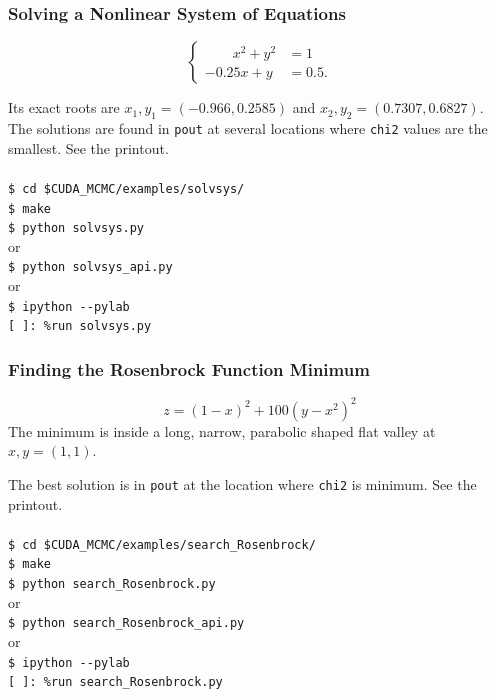 \documentclass[preprint2]{aastex}
\begin{document}
\subsubsection{Solving a Nonlinear System of Equations}

\begin{equation}
  \begin{cases}
    \qquad x^2 + y^2 &= 1 \\
    -0.25x + y &= 0.5.
  \end{cases}
\end{equation}

Its exact roots are $x_1,y_1 = (-0.966, 0.2585)$ and $x_2,y_2 = (0.7307, 0.6827)$.
The solutions are found in \verb|pout| at several locations where \verb|chi2| values 
are the smallest. See the printout. \\\\
\verb|$ cd $CUDA_MCMC/examples/solvsys/| \\
\verb|$ make| \\
\verb|$ python solvsys.py| \\
or \\
\verb|$ python solvsys_api.py| \\
or \\
\verb|$ ipython --pylab| \\
\verb|[ ]: %run solvsys.py| \\


\subsubsection{Finding the Rosenbrock Function Minimum}

\begin{equation}
  z = (1 - x)^2 + 100(y - x^2)^2
\end{equation}
The minimum is inside a long, narrow, parabolic shaped flat valley at $x,y = (1,1)$.

The best solution is in \verb|pout| at the location where \verb|chi2| is minimum. See the printout. \\\\
\verb|$ cd $CUDA_MCMC/examples/search_Rosenbrock/| \\
\verb|$ make| \\
\verb|$ python search_Rosenbrock.py| \\
or \\
\verb|$ python search_Rosenbrock_api.py| \\
or \\
\verb|$ ipython --pylab| \\
\verb|[ ]: %run search_Rosenbrock.py| \\
\end{document}
